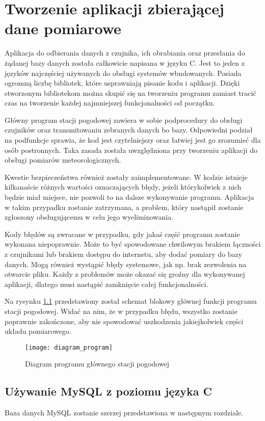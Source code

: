 \chapter{Tworzenie aplikacji zbierającej dane pomiarowe}

Aplikacja do odbierania danych z czujnika, ich obrabiania oraz przesłania do żądanej bazy danych została całkowicie napisana w języku C. Jest to jeden z języków najczęściej używanych do obsługi systemów wbudowanych. Posiada ogromną liczbę bibliotek, które usprawniają pisanie kodu i aplikacji. Dzięki stworzonym bibliotekom można skupić się na tworzeniu programu zamiast tracić czas na tworzenie każdej najmniejszej funkcjonalności od początku.

Główny program stacji pogodowej zawiera w sobie podprocedury do obsługi czujników oraz transmitowaniu zebranych danych bo bazy. Odpowiedni podział na podfunkcje sprawia, że kod jest czytelniejszy oraz łatwiej jest go zrozumieć dla osób postronnych. Taka zasada została uwzględniona przy tworzeniu aplikacji do obsługi pomiarów meteorologicznych.

Kwestie bezpieczeństwa również zostały zaimplementowane. W kodzie istnieje kilkanaście różnych wartości oznaczających błędy, jeżeli którykolwiek z nich będzie miał miejsce, nie pozwoli to na dalsze wykonywanie programu. Aplikacja w takim przypadku zostanie zatrzymana, a problem, który nastąpił zostanie zgłoszony obsługującemu w celu jego wyeliminowania.

Kody błędów są zwracane w przypadku, gdy jakaś część programu zostanie wykonana niepoprawnie. Może to być spowodowane chwilowym brakiem łączności z czujnikami lub brakiem dostępu do internetu, aby dodać pomiary do bazy danych. Mogą również wystąpić błędy systemowe, jak np. brak zezwolenia na otwarcie pliku. Każdy z problemów może okazać się groźny dla wykonywanej aplikacji, dlatego musi nastąpić zamknięcie całej funkcjonalności.

Na rysynku \ref{fig:diagram_program} przedstawiony został schemat blokowy głównej funkcji programu stacji pogodowej. Widać na nim, że w przypadku błędu, wszystko zostanie poprawnie zakończone, aby nie spowodować uszkodzenia jakiejkolwiek części układu pomiarowego.

\begin{figure}[h]
\centering
\texttt{[image: diagram\_program]}
\caption{Diagram programu głównego stacji pogodowej}
\label{fig:diagram_program}
\end{figure}

\section*{Używanie MySQL z poziomu języka C}
Baza danych MySQL zostanie szerzej przedstawiona w następnym rozdziale.

